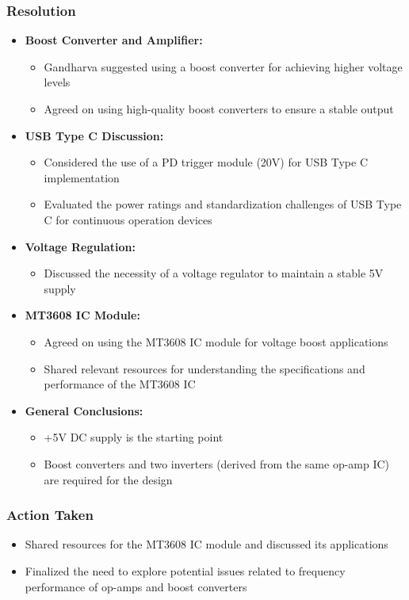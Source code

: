 \documentclass[12pt,a4paper]{article}
\begin{document}
\subsubsection*{Resolution}
\begin{itemize}
    \item \textbf{Boost Converter and Amplifier:}
    \begin{itemize}
        \item Gandharva suggested using a boost converter for achieving higher voltage levels
        \item Agreed on using high-quality boost converters to ensure a stable output
    \end{itemize}
    \item \textbf{USB Type C Discussion:}
    \begin{itemize}
        \item Considered the use of a PD trigger module (20V) for USB Type C implementation
        \item Evaluated the power ratings and standardization challenges of USB Type C for continuous operation devices
    \end{itemize}
    \item \textbf{Voltage Regulation:}
    \begin{itemize}
        \item Discussed the necessity of a voltage regulator to maintain a stable 5V supply
    \end{itemize}
    \item \textbf{MT3608 IC Module:}
    \begin{itemize}
        \item Agreed on using the MT3608 IC module for voltage boost applications
        \item Shared relevant resources for understanding the specifications and performance of the MT3608 IC
    \end{itemize}
    \item \textbf{General Conclusions:}
    \begin{itemize}
        \item +5V DC supply is the starting point
        \item Boost converters and two inverters (derived from the same op-amp IC) are required for the design
    \end{itemize}
\end{itemize}

\subsubsection*{Action Taken}
\begin{itemize}
    \item Shared resources for the MT3608 IC module and discussed its applications
    \item Finalized the need to explore potential issues related to frequency performance of op-amps and boost converters
\end{itemize}
\end{document}
